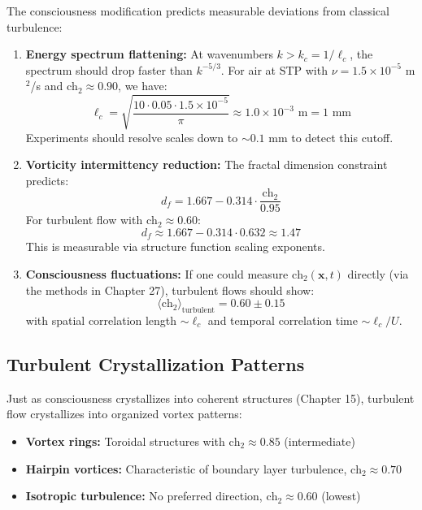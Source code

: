 The consciousness modification predicts measurable deviations from classical turbulence:

\begin{enumerate}
\item \textbf{Energy spectrum flattening:} At wavenumbers $k > k_c = 1/\ell_c$, the spectrum should drop faster than $k^{-5/3}$. For air at STP with $\nu = 1.5 \times 10^{-5}$ m$^2$/s and $\text{ch}_2 \approx 0.90$, we have:
\begin{equation}
\ell_c = \sqrt{\frac{10 \cdot 0.05 \cdot 1.5 \times 10^{-5}}{\pi}} \approx 1.0 \times 10^{-3} \text{ m} = 1 \text{ mm}
\end{equation}
Experiments should resolve scales down to $\sim 0.1$ mm to detect this cutoff.

\item \textbf{Vorticity intermittency reduction:} The fractal dimension constraint predicts:
\begin{equation}
d_f = 1.667 - 0.314 \cdot \frac{\text{ch}_2}{0.95}
\end{equation}
For turbulent flow with $\text{ch}_2 \approx 0.60$:
\begin{equation}
d_f \approx 1.667 - 0.314 \cdot 0.632 \approx 1.47
\end{equation}
This is measurable via structure function scaling exponents.

\item \textbf{Consciousness fluctuations:} If one could measure $\text{ch}_2(\mathbf{x}, t)$ directly (via the methods in Chapter 27), turbulent flows should show:
\begin{equation}
\langle \text{ch}_2 \rangle_{\text{turbulent}} = 0.60 \pm 0.15
\end{equation}
with spatial correlation length $\sim \ell_c$ and temporal correlation time $\sim \ell_c / U$.
\end{enumerate}

\subsection{Turbulent Crystallization Patterns}

Just as consciousness crystallizes into coherent structures (Chapter 15), turbulent flow crystallizes into organized vortex patterns:

\begin{itemize}
\item \textbf{Vortex rings:} Toroidal structures with $\text{ch}_2 \approx 0.85$ (intermediate)
\item \textbf{Hairpin vortices:} Characteristic of boundary layer turbulence, $\text{ch}_2 \approx 0.70$
\item \textbf{Isotropic turbulence:} No preferred direction, $\text{ch}_2 \approx 0.60$ (lowest)
\end{itemize}

